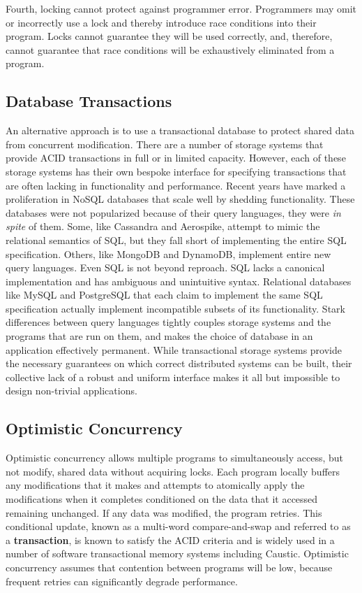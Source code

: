\documentclass[../main.tex]{subfiles}
\begin{document}
  Fourth, locking cannot protect against programmer error. Programmers may omit or incorrectly use a
  lock and thereby introduce race conditions into their program. Locks cannot guarantee they will be
  used correctly, and, therefore, cannot guarantee that race conditions will be exhaustively
  eliminated from a program.

  \subsection{Database Transactions}
  An alternative approach is to use a transactional database to protect shared data from concurrent
  modification. There are a number of storage systems that provide ACID transactions in full or in
  limited capacity. However, each of these storage systems has their own bespoke interface for
  specifying transactions that are often lacking in functionality and performance. Recent years have
  marked a proliferation in NoSQL databases that scale well by shedding functionality. These
  databases were not popularized because of their query languages, they were \emph{in spite} of
  them. Some, like Cassandra and Aerospike, attempt to mimic the relational semantics of SQL, but
  they fall short of implementing the entire SQL specification. Others, like MongoDB and DynamoDB,
  implement entire new query languages. Even SQL is not beyond reproach. SQL lacks a canonical
  implementation and has ambiguous and unintuitive syntax. \cite{sql} Relational databases like
  MySQL and PostgreSQL that each claim to implement the same SQL specification actually implement
  incompatible subsets of its functionality. Stark differences between query languages tightly
  couples storage systems and the programs that are run on them, and makes the choice of database
  in an application effectively permanent. While transactional storage systems provide the necessary
  guarantees on which correct distributed systems can be built, their collective lack of a robust
  and uniform interface makes it all but impossible to design non-trivial applications.

  \subsection{Optimistic Concurrency}
  Optimistic concurrency allows multiple programs to simultaneously access, but not modify, shared
  data without acquiring locks. Each program locally buffers any modifications that it makes and
  attempts to atomically apply the modifications when it completes conditioned on the data that it
  accessed remaining unchanged. If any data was modified, the program retries. This conditional
  update, known as a multi-word compare-and-swap and referred to as a \textbf{transaction}, is known
  to satisfy the ACID criteria and is widely used in a number of software transactional memory
  systems including Caustic. \cite{stm} Optimistic concurrency assumes that contention between
  programs will be low, because frequent retries can significantly degrade performance.
\end{document}
